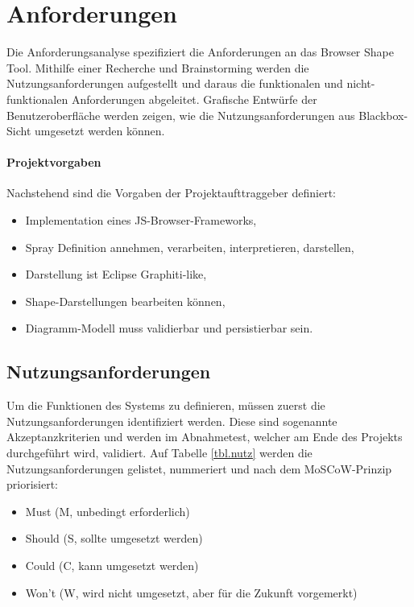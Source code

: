 \section{Anforderungen}

Die Anforderungsanalyse spezifiziert die Anforderungen an das
Browser Shape Tool. 
Mithilfe einer Recherche und Brainstorming werden die Nutzungsanforderungen
aufgestellt und daraus die funktionalen und nicht-funktionalen
Anforderungen abgeleitet. Grafische Entwürfe der Benutzeroberfläche
werden zeigen, wie die Nutzungsanforderungen aus Blackbox-Sicht
umgesetzt werden können.

\paragraph{Projektvorgaben}
Nachstehend sind die Vorgaben der Projektaufttraggeber definiert:
\begin{itemize}
  \item Implementation eines JS-Browser-Frameworks,
  \item Spray Definition annehmen, verarbeiten, interpretieren, darstellen,
  \item Darstellung ist Eclipse Graphiti-like,
  \item Shape-Darstellungen bearbeiten können,
  \item Diagramm-Modell muss validierbar und persistierbar sein.
\end{itemize}

\subsection{Nutzungsanforderungen}
Um die Funktionen des Systems zu definieren, müssen zuerst die Nutzungsanforderungen
identifiziert werden. Diese sind sogenannte Akzeptanzkriterien und werden
im Abnahmetest, welcher am Ende des Projekts durchgeführt wird, validiert.
Auf Tabelle \ref{tbl.nutz} werden die Nutzungsanforderungen gelistet,
nummeriert und nach dem MoSCoW-Prinzip priorisiert:

\begin{itemize}
  \item Must  (M, unbedingt erforderlich)
  \item Should (S, sollte umgesetzt werden)
  \item Could (C, kann umgesetzt werden)
  \item Won’t (W, wird nicht umgesetzt, aber für die Zukunft vorgemerkt)
\end{itemize}

